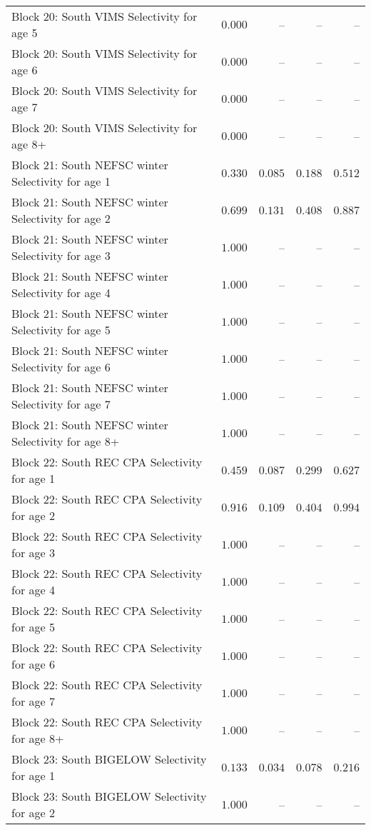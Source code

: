 \documentclass[
]{article}
\begin{document}
\begin{landscape}
\begin{longtable}[t]{lrrrr}
Block 20: South VIMS Selectivity for age 5 & $0.000$ & -- & -- & --\\
Block 20: South VIMS Selectivity for age 6 & $0.000$ & -- & -- & --\\
Block 20: South VIMS Selectivity for age 7 & $0.000$ & -- & -- & --\\
\addlinespace
Block 20: South VIMS Selectivity for age 8+ & $0.000$ & -- & -- & --\\
Block 21: South NEFSC winter Selectivity for age 1 & $0.330$ & $0.085$ & $0.188$ & $0.512$\\
Block 21: South NEFSC winter Selectivity for age 2 & $0.699$ & $0.131$ & $0.408$ & $0.887$\\
Block 21: South NEFSC winter Selectivity for age 3 & $1.000$ & -- & -- & --\\
Block 21: South NEFSC winter Selectivity for age 4 & $1.000$ & -- & -- & --\\
\addlinespace
Block 21: South NEFSC winter Selectivity for age 5 & $1.000$ & -- & -- & --\\
Block 21: South NEFSC winter Selectivity for age 6 & $1.000$ & -- & -- & --\\
Block 21: South NEFSC winter Selectivity for age 7 & $1.000$ & -- & -- & --\\
Block 21: South NEFSC winter Selectivity for age 8+ & $1.000$ & -- & -- & --\\
Block 22: South REC CPA Selectivity for age 1 & $0.459$ & $0.087$ & $0.299$ & $0.627$\\
\addlinespace
Block 22: South REC CPA Selectivity for age 2 & $0.916$ & $0.109$ & $0.404$ & $0.994$\\
Block 22: South REC CPA Selectivity for age 3 & $1.000$ & -- & -- & --\\
Block 22: South REC CPA Selectivity for age 4 & $1.000$ & -- & -- & --\\
Block 22: South REC CPA Selectivity for age 5 & $1.000$ & -- & -- & --\\
Block 22: South REC CPA Selectivity for age 6 & $1.000$ & -- & -- & --\\
\addlinespace
Block 22: South REC CPA Selectivity for age 7 & $1.000$ & -- & -- & --\\
Block 22: South REC CPA Selectivity for age 8+ & $1.000$ & -- & -- & --\\
Block 23: South BIGELOW Selectivity for age 1 & $0.133$ & $0.034$ & $0.078$ & $0.216$\\
Block 23: South BIGELOW Selectivity for age 2 & $1.000$ & -- & -- & --\\

\end{longtable}
\end{landscape}
\end{document}
